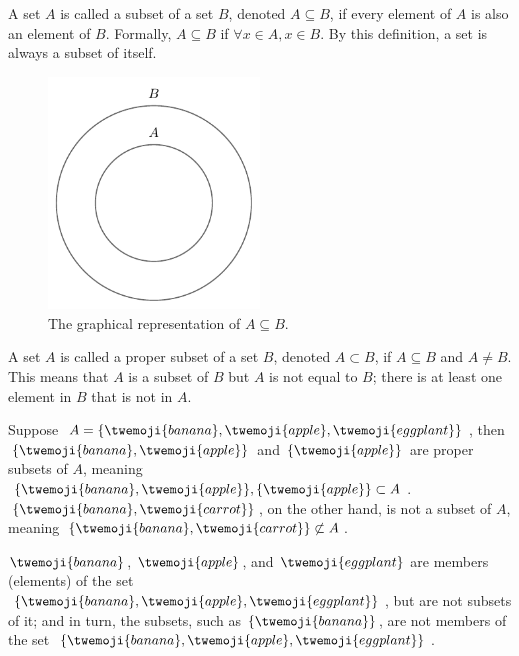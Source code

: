 \begin{definition}[Subset]
	A set $A$ is called a subset of a set $B$, denoted $A \subseteq B$, if every element of $A$ is also an element of $B$. Formally, $A\subseteq B$ if $\forall x \in A, x \in B$. By this definition, a set is always a subset of itself.
	\begin{figure}[H]
		\centering
		\includegraphics[width = 0.5\textwidth]{figures/set_subset.pdf}
		\caption{The graphical representation of $A\subseteq B$.}
		\label{fig:set_subset}
	\end{figure}
\end{definition}

\begin{definition}
	A set $A$ is called a proper subset of a set $B$, denoted $A \subset B$, if $A \subseteq B$ and $A \neq B$. This means that $A$ is a subset of $B$ but $A$ is not equal to $B$; there is at least one element in $B$ that is not in $A$.
\end{definition}

\begin{example}
	Suppose $A = \{\twemoji{banana}, \twemoji{apple}, \twemoji{eggplant}\}$, then $\{\twemoji{banana}, \twemoji{apple}\}$ and $\{\twemoji{apple}\}$ are proper subsets of $A$, meaning $\{\twemoji{banana}, \twemoji{apple}\},\{\twemoji{apple}\}\subset  A$. $\{\twemoji{banana}, \twemoji{carrot}\}$, on the other hand, is not a subset of $A$, meaning $\{\twemoji{banana}, \twemoji{carrot}\}\not\subset  A$.
\end{example}
\begin{example}
	$\twemoji{banana}$, $\twemoji{apple}$, and $\twemoji{eggplant}$ are members (elements) of the set $\{\twemoji{banana}, \twemoji{apple}, \twemoji{eggplant}\}$, but are not subsets of it; and in turn, the subsets, such as $\{\twemoji{banana}\}$, are not members of the set $\{\twemoji{banana}, \twemoji{apple}, \twemoji{eggplant}\}$.
\end{example}

